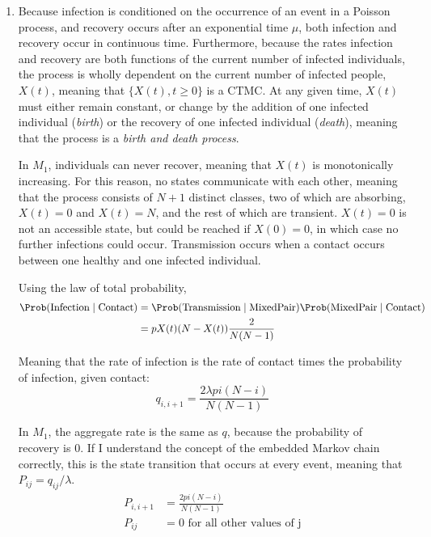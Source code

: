 \begin{solution}
    \begin{enumerate}
        \item Because infection is conditioned on the occurrence of an
            event in a Poisson process, and recovery occurs after an
            exponential time $\mu$, both infection and recovery occur
            in continuous time. Furthermore, because the rates infection
            and recovery are both functions of the current number of
            infected individuals, the process is wholly dependent on the
            current number of infected people, $X(t)$, meaning that
            $\{X(t), t \ge 0\}$ is a CTMC. At any given time, $X(t)$
            must either remain constant, or change by the addition of
            one infected individual (\emph{birth}) or the recovery of
            one infected individual (\emph{death}), meaning that the
            process is a \emph{birth and death process}.

            In $M_1$, individuals can never recover, meaning that $X(t)$
            is monotonically increasing. For this reason, no states
            communicate with each other, meaning that the process
            consists of $N + 1$ distinct classes, two of which are
            absorbing, $X(t) = 0$ and $X(t) = N$, and the rest of which
            are transient. $X(t) = 0$ is not an accessible state, but
            could be reached if $X(0) = 0$, in which case no further
            infections could occur. Transmission occurs when a contact
            occurs between one healthy and one infected individual.

            Using the law of total probability,
            \begin{align*}
                \Prob(\text{Infection}\mid\text{Contact})
                &=
                \Prob(\text{Transmission} \mid \text{MixedPair})
                \Prob(\text{MixedPair} \mid \text{Contact})\\
                &= pX(t)(N-X(t))\frac{2}{N(N - 1)}
            \end{align*}

            Meaning that the rate of infection is the rate of contact
            times the probability of infection, given contact:
            \[
                q_{i,i+1} = \frac{2\lambda p i(N-i)}{N(N-1)}
            \]

            In $M_1$, the aggregate rate is the same as $q$, because
            the probability of recovery is 0. If I understand the
            concept of the embedded Markov chain correctly, this is the
            state transition that occurs at every event, meaning that
            $P_{ij}=q_{ij} / \lambda$.
            \begin{align*}
                P_{i,i+1} &= \frac{2pi(N-i)}{N(N-1)}\\
                P_{ij} &= 0 \text{ for all other values of j}
            \end{align*}


\end{enumerate}
\end{solution}
